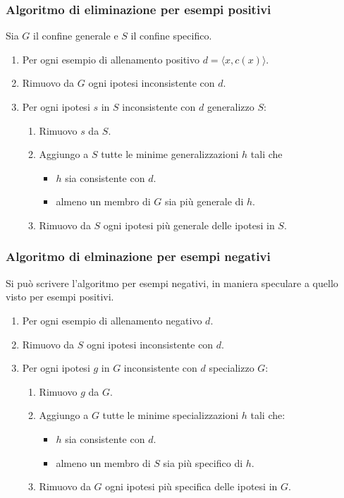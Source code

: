 \subsubsection{Algoritmo di eliminazione per esempi positivi}
Sia $G$ il confine generale e $S$ il confine specifico.
\begin{enumerate}
	\item Per ogni esempio di allenamento positivo $d = \langle x, c(x) \rangle$.
	\item Rimuovo da $G$ ogni ipotesi inconsistente con $d$.
	\item Per ogni ipotesi $s$ in $S$ inconsistente con $d$ generalizzo $S$:
	      \begin{enumerate}
		      \item Rimuovo $s$ da $S$.
		      \item Aggiungo a $S$ tutte le minime generalizzazioni $h$ tali che
		            \begin{itemize}
			            \item $h$ sia consistente con $d$.
			            \item almeno un membro di $G$ sia pi\`u generale di $h$.
		            \end{itemize}
		      \item Rimuovo da $S$ ogni ipotesi pi\`u generale delle ipotesi in $S$.
	      \end{enumerate}
\end{enumerate}

\subsubsection{Algoritmo di elminazione per esempi negativi}
Si pu\`o scrivere l'algoritmo per esempi negativi, in maniera speculare a quello visto per esempi positivi.
\begin{enumerate}
	\item Per ogni esempio di allenamento negativo $d$.
	\item Rimuovo da $S$ ogni ipotesi inconsistente con $d$.
	\item Per ogni ipotesi $g$ in $G$ inconsistente con $d$ specializzo $G$:
	      \begin{enumerate}
		      \item Rimuovo $g$ da $G$.
		      \item Aggiungo a $G$ tutte le minime specializzazioni $h$ tali che:
		            \begin{itemize}
			            \item $h$ sia consistente con $d$.
			            \item almeno un membro di $S$ sia pi\`u specifico di $h$.
		            \end{itemize}
		      \item Rimuovo da $G$ ogni ipotesi pi\`u specifica delle ipotesi in $G$.
	      \end{enumerate}
\end{enumerate}

